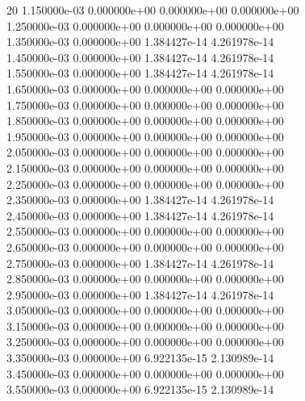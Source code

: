 20	1.150000e-03	0.000000e+00	0.000000e+00	0.000000e+00	\\ 	1.250000e-03	0.000000e+00	0.000000e+00	0.000000e+00	\\ 	1.350000e-03	0.000000e+00	1.384427e-14	4.261978e-14	\\ 	1.450000e-03	0.000000e+00	1.384427e-14	4.261978e-14	\\ 	1.550000e-03	0.000000e+00	1.384427e-14	4.261978e-14	\\ 	1.650000e-03	0.000000e+00	0.000000e+00	0.000000e+00	\\ 	1.750000e-03	0.000000e+00	0.000000e+00	0.000000e+00	\\ 	1.850000e-03	0.000000e+00	0.000000e+00	0.000000e+00	\\ 	1.950000e-03	0.000000e+00	0.000000e+00	0.000000e+00	\\ 	2.050000e-03	0.000000e+00	0.000000e+00	0.000000e+00	\\ 	2.150000e-03	0.000000e+00	0.000000e+00	0.000000e+00	\\ 	2.250000e-03	0.000000e+00	0.000000e+00	0.000000e+00	\\ 	2.350000e-03	0.000000e+00	1.384427e-14	4.261978e-14	\\ 	2.450000e-03	0.000000e+00	1.384427e-14	4.261978e-14	\\ 	2.550000e-03	0.000000e+00	0.000000e+00	0.000000e+00	\\ 	2.650000e-03	0.000000e+00	0.000000e+00	0.000000e+00	\\ 	2.750000e-03	0.000000e+00	1.384427e-14	4.261978e-14	\\ 	2.850000e-03	0.000000e+00	0.000000e+00	0.000000e+00	\\ 	2.950000e-03	0.000000e+00	1.384427e-14	4.261978e-14	\\ 	3.050000e-03	0.000000e+00	0.000000e+00	0.000000e+00	\\ 	3.150000e-03	0.000000e+00	0.000000e+00	0.000000e+00	\\ 	3.250000e-03	0.000000e+00	0.000000e+00	0.000000e+00	\\ 	3.350000e-03	0.000000e+00	6.922135e-15	2.130989e-14	\\ 	3.450000e-03	0.000000e+00	0.000000e+00	0.000000e+00	\\ 	3.550000e-03	0.000000e+00	6.922135e-15	2.130989e-14	\\ \hline
